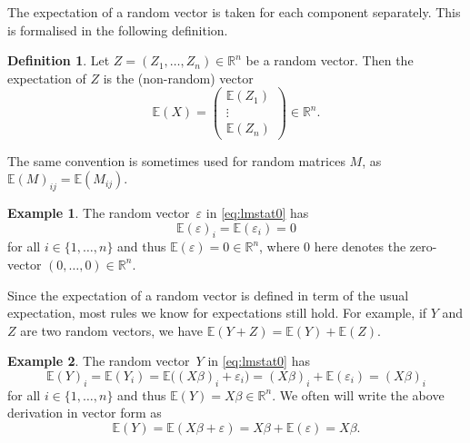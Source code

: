 \documentclass[
  a4paper,
]{article}
\theoremstyle{definition}
\newtheorem{definition}{Definition}[section]
\theoremstyle{definition}
\newtheorem{example}{Example}[section]
\theoremstyle{definition}
\theoremstyle{definition}
\theoremstyle{remark}
\begin{document}
The expectation of a random vector is taken for each component separately.
This is formalised in the following definition.

\begin{definition}
Let \(Z = (Z_1, \ldots, Z_n) \in \mathbb{R}^n\) be a random vector.
Then the expectation of \(Z\) is the (non-random) vector
\begin{equation*}
    \mathbb{E}(X)
    = \begin{pmatrix}
      \mathbb{E}(Z_1) \\ \vdots \\ \mathbb{E}(Z_n)
    \end{pmatrix}
    \in \mathbb{R}^n.
  \end{equation*}
\end{definition}

The same convention is sometimes used for random matrices \(M\),
as \(\mathbb{E}(M)_{ij} = \mathbb{E}(M_{ij})\).

\begin{example}
The random vector~\(\varepsilon\) in \eqref{eq:lmstat0} has
\begin{equation*}
    \mathbb{E}(\varepsilon)_i = \mathbb{E}(\varepsilon_i) = 0
  \end{equation*}
for all \(i \in \{1, \ldots, n\}\) and thus \(\mathbb{E}(\varepsilon) = 0 \in \mathbb{R}^n\),
where \(0\) here denotes the zero-vector \((0, \ldots, 0) \in \mathbb{R}^n\).
\end{example}

Since the expectation of a random vector is defined in term of the
usual expectation, most rules we know for expectations still hold.
For example, if \(Y\) and \(Z\) are two random vectors, we have
\(\mathbb{E}(Y+Z) = \mathbb{E}(Y) + \mathbb{E}(Z)\).

\begin{example}
\protect\hypertarget{exm:E-of-Y}{}\label{exm:E-of-Y}The random vector~\(Y\) in \eqref{eq:lmstat0} has
\begin{equation*}
    \mathbb{E}(Y)_i
    = \mathbb{E}(Y_i)
    = \mathbb{E}\bigl( (X\beta)_i + \varepsilon_i \bigr)
    = (X\beta)_i + \mathbb{E}(\varepsilon_i)
    = (X\beta)_i
  \end{equation*}
for all \(i \in \{1, \ldots, n\}\) and thus \(\mathbb{E}(Y) = X\beta \in \mathbb{R}^n\).
We often will write the above derivation in vector form
as
\begin{equation*}
    \mathbb{E}(Y)
    = \mathbb{E}(X\beta + \varepsilon)
    = X\beta + \mathbb{E}(\varepsilon)
    = X\beta.
  \end{equation*}
\end{example}
\end{document}
